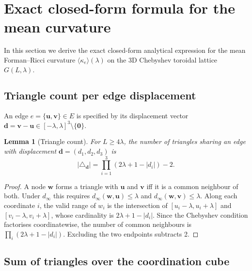 \documentclass[aps,pre,onecolumn,10pt,groupedaddress,amsmath,amssymb,floatfix]{revtex4-2}
\newtheorem{lemma}{Lemma}
\begin{document}
\section{Exact closed-form formula for the mean curvature}
\label{sec:closed_form}

In this section we derive the exact closed-form analytical expression for the mean Forman--Ricci curvature $\langle\kappa_e\rangle(\lambda)$ on the 3D Chebyshev toroidal lattice $G(L, \lambda)$.

\subsection{Triangle count per edge displacement}

An edge $e = \{\mathbf{u}, \mathbf{v}\} \in E$ is specified by its displacement vector $\mathbf{d} = \mathbf{v} - \mathbf{u} \in [-\lambda, \lambda]^3 \setminus \{\mathbf{0}\}$.

\begin{lemma}[Triangle count]
\label{lem:triangles}
For $L \ge 4\lambda$, the number of triangles sharing an edge with displacement $\mathbf{d} = (d_1, d_2, d_3)$ is
\begin{equation}
|\triangle_{\mathbf{d}}| = \prod_{i=1}^3 (2\lambda + 1 - |d_i|) - 2.
\label{eq:triangles}
\end{equation}
\end{lemma}
\begin{proof}
A node $\mathbf{w}$ forms a triangle with $\mathbf{u}$ and $\mathbf{v}$ iff it is a common neighbour of both. Under $d_\infty$ this requires $d_\infty(\mathbf{w}, \mathbf{u}) \le \lambda$ and $d_\infty(\mathbf{w}, \mathbf{v}) \le \lambda$. Along each coordinate $i$, the valid range of $w_i$ is the intersection of $[u_i - \lambda, u_i + \lambda]$ and $[v_i - \lambda, v_i + \lambda]$, whose cardinality is $2\lambda + 1 - |d_i|$. Since the Chebyshev condition factorises coordinatewise, the number of common neighbours is $\prod_i (2\lambda + 1 - |d_i|)$. Excluding the two endpoints subtracts 2.
\end{proof}

\subsection{Sum of triangles over the coordination cube}
\end{document}
